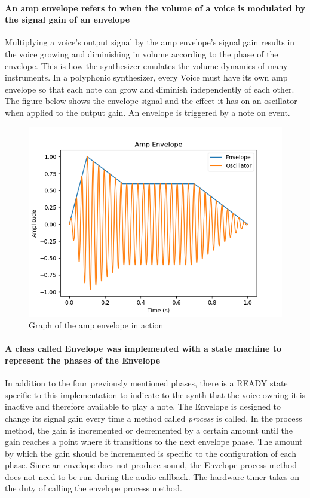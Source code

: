 \documentclass[acmlarge,screen]{acmart}
\begin{document}
	\paragraph{An amp envelope refers to when the volume of a voice is modulated by the signal gain of an envelope} Multiplying a voice's output signal by the amp envelope's signal gain results in the voice growing and diminishing in volume according to the phase of the envelope. This is how the synthesizer emulates the volume dynamics of many instruments. In a polyphonic synthesizer, every Voice must have its own amp envelope so that each note can grow and diminish independently of each other. The figure below shows the envelope signal and the effect it has on an oscillator when applied to the output gain. An envelope is triggered by a note on event. 
	
	\begin{figure}
		\centering
		\includegraphics[width=.8\linewidth]{amp_envelope_visual}
		\caption{Graph of the amp envelope in action}
	\end{figure}
	
	\paragraph{A class called Envelope was implemented with a state machine to represent the phases of the Envelope} In addition to the four previously mentioned phases, there is a READY state specific to this implementation to indicate to the synth that the voice owning it is inactive and therefore available to play a note. The Envelope is designed to change its signal gain every time a method called \textit{process} is called. In the process method, the gain is incremented or decremented by a certain amount until the gain reaches a point where it transitions to the next envelope phase. The amount by which the gain should be incremented is specific to the configuration of each phase. Since an envelope does not produce sound, the Envelope process method does not need to be run during the audio callback. The hardware timer takes on the duty of calling the envelope process method.
	
\end{document}
